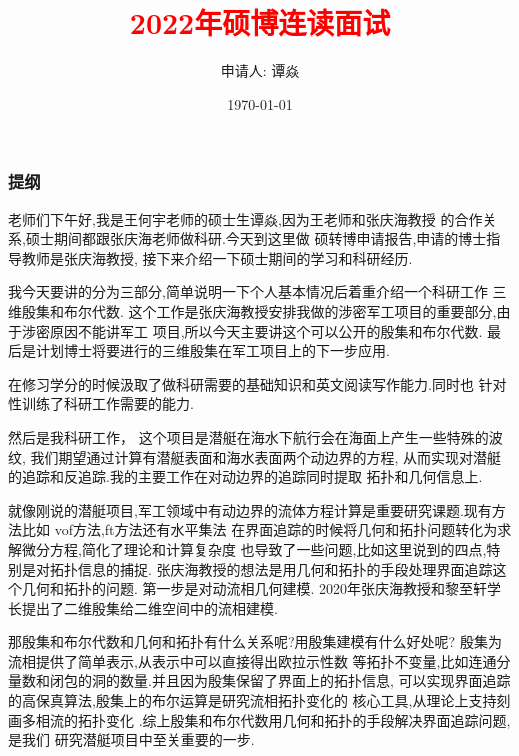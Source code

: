 \documentclass[UTF8]{ctexbeamer}	%
\title{\textcolor{red}{2022年硕博连读面试}}
\author{申请人: 谭焱 
 }
\institute{\small{现硕士导师: 王何宇 、张庆海 \newline 拟转博士指导教师: 张庆海} \newline   \newline 浙江大学数学科学学院}
\date{\today}
\theoremstyle{plain}
\theoremstyle{definition}
\theoremstyle{remark}
\numberwithin{equation}{section}
\begin{document}
\begin{frame}
  \titlepage
\end{frame}


\begin{frame}
  \frametitle{提纲}
  \tableofcontents
\end{frame}

\begin{frame}
  老师们下午好,我是王何宇老师的硕士生谭焱,因为王老师和张庆海教授
  的合作关系,硕士期间都跟张庆海老师做科研.今天到这里做
  硕转博申请报告,申请的博士指导教师是张庆海教授,
  接下来介绍一下硕士期间的学习和科研经历.
\end{frame}

\begin{frame}
  我今天要讲的分为三部分,简单说明一下个人基本情况后着重介绍一个科研工作
  三维殷集和布尔代数.
  这个工作是张庆海教授安排我做的涉密军工项目的重要部分,由于涉密原因不能讲军工
  项目,所以今天主要讲这个可以公开的殷集和布尔代数.
  最后是计划博士将要进行的三维殷集在军工项目上的下一步应用.
\end{frame}

\begin{frame}
  在修习学分的时候汲取了做科研需要的基础知识和英文阅读写作能力.同时也
  针对性训练了科研工作需要的能力.
\end{frame}

\begin{frame}
  然后是我科研工作，
  这个项目是潜艇在海水下航行会在海面上产生一些特殊的波纹,
  我们期望通过计算有潜艇表面和海水表面两个动边界的方程,
  从而实现对潜艇的追踪和反追踪.我的主要工作在对动边界的追踪同时提取
  拓扑和几何信息上.
\end{frame}

\begin{frame}
  就像刚说的潜艇项目,军工领域中有动边界的流体方程计算是重要研究课题.现有方法比如
  vof方法,ft方法还有水平集法
  在界面追踪的时候将几何和拓扑问题转化为求解微分方程,简化了理论和计算复杂度
  也导致了一些问题,比如这里说到的四点,特别是对拓扑信息的捕捉.
  张庆海教授的想法是用几何和拓扑的手段处理界面追踪这个几何和拓扑的问题.
  第一步是对动流相几何建模.
  2020年张庆海教授和黎至轩学长提出了二维殷集给二维空间中的流相建模.
\end{frame}

\begin{frame}
  那殷集和布尔代数和几何和拓扑有什么关系呢?用殷集建模有什么好处呢?
  殷集为流相提供了简单表示,从表示中可以直接得出欧拉示性数
  等拓扑不变量,比如连通分量数和闭包的洞的数量.并且因为殷集保留了界面上的拓扑信息,
  可以实现界面追踪的高保真算法,殷集上的布尔运算是研究流相拓扑变化的
  核心工具,从理论上支持刻画多相流的拓扑变化
  .综上殷集和布尔代数用几何和拓扑的手段解决界面追踪问题,是我们
  研究潜艇项目中至关重要的一步.
\end{frame}
\end{document}
